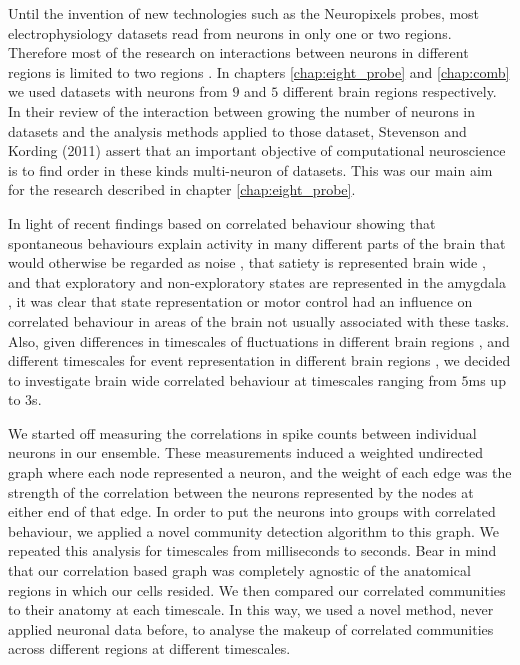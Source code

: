 Until the invention of new technologies such as the Neuropixels probes, most electrophysiology datasets read from neurons in only one or two regions. Therefore most of the research on interactions between neurons in different regions is limited to two regions \parencite{wierzynski, patterson, girard}. In chapters \ref{chap:eight_probe} and \ref{chap:comb} we used datasets with neurons from $9$ and $5$ different brain regions respectively. In their review of the interaction between growing the number of neurons in datasets and the analysis methods applied to those dataset, Stevenson and Kording (2011) assert that an important objective of computational neuroscience is to find order in these kinds multi-neuron of datasets. This was our main aim for the research described in chapter \ref{chap:eight_probe}.


In light of recent findings based on correlated behaviour showing that spontaneous behaviours explain activity in many different parts of the brain that would otherwise be regarded as noise \parencite{stringer}, that satiety is represented brain wide \parencite{allen}, and that exploratory and non-exploratory states are represented in the amygdala \parencite{grundemann}, it was clear that state representation or motor control had an influence on correlated behaviour in areas of the brain not usually associated with these tasks. Also, given differences in timescales of fluctuations in different brain regions \parencite{murray}, and different timescales for event representation in different brain regions \parencite{baldassano}, we decided to investigate brain wide correlated behaviour at timescales ranging from $5$ms up to $3$s.

We started off measuring the correlations in spike counts between individual neurons in our ensemble. These measurements induced a weighted undirected graph where each node represented a neuron, and the weight of each edge was the strength of the correlation between the neurons represented by the nodes at either end of that edge. In order to put the neurons into groups with correlated behaviour, we applied a novel community detection algorithm \parencite{humphries} to this graph. We repeated this analysis for timescales from milliseconds to seconds. Bear in mind that our correlation based graph was completely agnostic of the anatomical regions in which our cells resided. We then compared our correlated communities to their anatomy at each timescale. In this way, we used a novel method, never applied neuronal data before, to analyse the makeup of correlated communities across different regions at different timescales.

